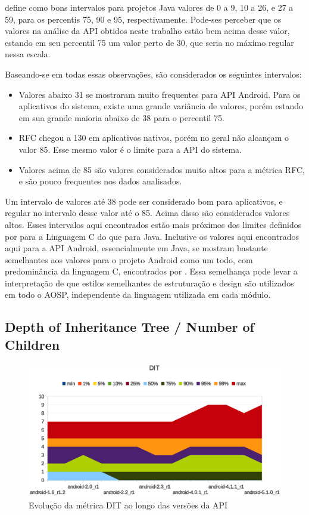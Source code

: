  define como bons intervalos para projetos Java valores de 0 a 9, 10 a 26, e 27 a 59, para os percentis 75, 90 e 95, respectivamente. Pode-ses perceber que os valores na análise da API obtidos neste trabalho estão bem acima desse valor, estando em seu percentil 75 um valor perto de 30, que seria no máximo regular nessa escala.

Baseando-se em todas essas observações, são considerados os seguintes intervalos:

\begin{itemize}
\item Valores abaixo 31 se mostraram muito frequentes para API Android. Para os aplicativos do sistema, existe uma grande variância de valores, porém estando em sua grande maioria abaixo de 38 para o percentil 75.
\item RFC chegou a 130 em aplicativos nativos, porém no geral não alcançam o valor 85. Esse mesmo valor é o limite para a API do sistema.
\item Valores acima de 85 são valores considerados muito altos para a métrica RFC, e são pouco frequentes nos dados analisados.
\end{itemize}

Um intervalo de valores até 38 pode ser considerado bom para aplicativos, e regular no intervalo desse valor até o 85. Acima disso são considerados valores altos. Esses intervalos aqui encontrados estão mais próximos dos limites definidos por  para a Linguagem C do que para Java. Inclusive os valores aqui encontrados aqui para a API Android, essencialmente em Java, se mostram bastante semelhantes aos valores para o projeto Android como um todo, com predominância da linguagem C, encontrados por . Essa semelhança pode levar a interpretação de que estilos semelhantes de estruturação e design são utilizados em todo o AOSP, independente da linguagem utilizada em cada módulo.

\subsection{Depth of Inheritance Tree / Number of Children}

\begin{figure}[!htb]
\centering
\includegraphics [keepaspectratio=true,scale=0.85]{figuras/graphs/dit_android.eps}
\caption{Evolução da métrica DIT ao longo das versões da API}
\label{fig:dit_android}
\end{figure}


